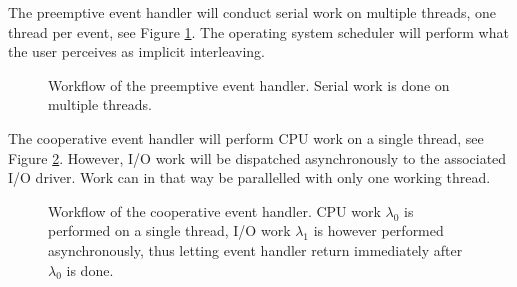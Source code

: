 The preemptive event handler will conduct serial work on multiple threads, one
thread per event, see Figure \ref{fig:event_handler_preemptive}. The operating
system scheduler will perform what the user perceives as implicit interleaving.

\begin{figure}[h!]
    \centering

    \caption[Workflow of the preemptive event handler.]{Workflow of the
    preemptive event handler. Serial work is done on multiple threads.}

    \label{fig:event_handler_preemptive}
\end{figure}

The cooperative event handler will perform CPU work on a single thread, see
Figure \ref{fig:event_handler_cooperative}.  However, I/O work will be
dispatched asynchronously to the associated I/O driver. Work can in that way be
parallelled with only one working thread.

\begin{figure}[h!]
    \centering

    \caption[Workflow of the cooperative event handler.]{Workflow of the
    cooperative event handler. CPU work $\lambda_0$ is performed on a single
    thread, I/O work $\lambda_1$ is however performed asynchronously, thus
    letting event handler return immediately after $\lambda_0$ is done.}

    \label{fig:event_handler_cooperative}
\end{figure}

